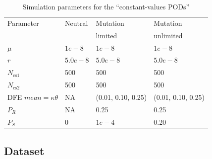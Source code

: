\documentclass[a4paper, 12pt]{article}
\begin{document}
\begin{table}[ht]
 \caption{Simulation parameters for the ``constant-values PODs''}
 \label{table:table2}
  \centering
  \begin{tabular}{llll}
   \cmidrule(r){1-4}
    Parameter                 & Neutral  & Mutation           & Mutation           \\
                              &          & limited            & unlimited           \\
    \midrule
    $\mu$                     & $1e-8$   & $1e-8$             & $1e-8$             \\
    $r$                       & $5.0e-8$ & $5.0e-8$           & $5.0e-8$           \\
    $N_{\mathrm{cs}1}$        & 500      & 500                & 500                \\
    $N_{\mathrm{cs}2}$        & 500      & 500                & 500                \\
    DFE $mean=\kappa\theta$   & NA       & (0.01, 0.10, 0.25) & (0.01, 0.10, 0.25) \\
    $P_{R}$                   & NA       & 0.25               & 0.25               \\
    $P_{S}$                   & 0        & $1e-4$             & 0.20               \\
    \bottomrule
  \end{tabular}
  \label{tab:tab2}
\end{table}

\subsection*{Dataset}
\end{document}
